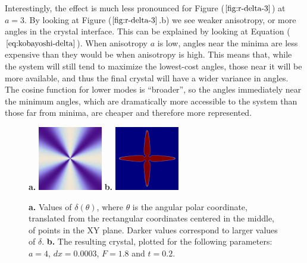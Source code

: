 \documentclass[10pt]{article} %
\begin{document}
Interestingly, the effect is much less pronounced for Figure ($\ref{fig:r-delta-3}$) at $a=3$. By looking at Figure ($\ref{fig:r-delta-3}$.b) we see weaker anisotropy, or more angles in the crystal interface. This can be explained by looking at Equation ($\ref{eq:kobayoshi-delta}$). When anisotropy $a$ is low, angles near the minima are less expensive than they would be when anisotropy is high. This means that, while the system will still tend to maximize the lowest-cost angles, those near it will be more available, and thus the final crystal will have a wider variance in angles. The cosine function for lower modes is ``broader'', so the angles immediately near the minimum angles, which are dramatically more accessible to the system than those far from minima, are cheaper and therefore more represented.\\

\begin{figure}[h!]
  \centering
  \textbf{a. }\includegraphics[width=0.25\textwidth]{../radial-anisotropy-4.png}
  \hspace{1cm}\textbf{b. }\includegraphics[width=0.25\textwidth]{../anis-4.png}
  \caption{\textbf{a.} Values of $\delta(\theta)$, where $\theta$ is the angular polar coordinate, translated from the rectangular coordinates centered in the middle, of points in the XY plane. Darker values correspond to larger values of $\delta$. \textbf{b.} The resulting crystal, plotted for the following parameters: $a=4$, $dx=0.0003$, $F=1.8$ and $t=0.2$.}
  \label{fig:r-delta-4}
\end{figure}
\end{document}

